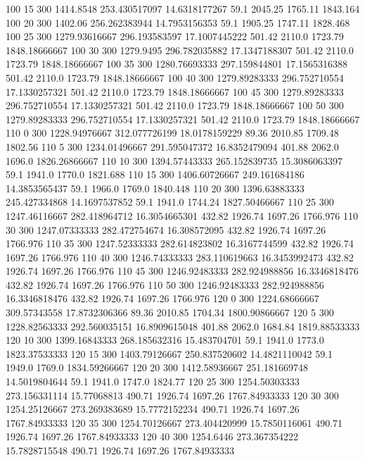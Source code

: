 100  15  300  1414.8548  253.430517097  14.6318177267  59.1  2045.25  1765.11  1843.164 
100  20  300  1402.06  256.262383944  14.7953156353  59.1  1905.25  1747.11  1828.468 
100  25  300  1279.93616667  296.193583597  17.1007445222  501.42  2110.0  1723.79  1848.18666667 
100  30  300  1279.9495  296.782035882  17.1347188307  501.42  2110.0  1723.79  1848.18666667 
100  35  300  1280.76693333  297.159844801  17.1565316388  501.42  2110.0  1723.79  1848.18666667 
100  40  300  1279.89283333  296.752710554  17.1330257321  501.42  2110.0  1723.79  1848.18666667 
100  45  300  1279.89283333  296.752710554  17.1330257321  501.42  2110.0  1723.79  1848.18666667 
100  50  300  1279.89283333  296.752710554  17.1330257321  501.42  2110.0  1723.79  1848.18666667 
110  0  300  1228.94976667  312.077726199  18.0178159229  89.36  2010.85  1709.48  1802.56 
110  5  300  1234.01496667  291.595047372  16.8352479094  401.88  2062.0  1696.0  1826.26866667 
110  10  300  1394.57443333  265.152839735  15.3086063397  59.1  1941.0  1770.0  1821.688 
110  15  300  1406.60726667  249.161684186  14.3853565437  59.1  1966.0  1769.0  1840.448 
110  20  300  1396.63883333  245.427334868  14.1697537852  59.1  1941.0  1744.24  1827.50466667 
110  25  300  1247.46116667  282.418964712  16.3054665301  432.82  1926.74  1697.26  1766.976 
110  30  300  1247.07333333  282.472754674  16.308572095  432.82  1926.74  1697.26  1766.976 
110  35  300  1247.52333333  282.614823802  16.3167744599  432.82  1926.74  1697.26  1766.976 
110  40  300  1246.74333333  283.110619663  16.3453992473  432.82  1926.74  1697.26  1766.976 
110  45  300  1246.92483333  282.924988856  16.3346818476  432.82  1926.74  1697.26  1766.976 
110  50  300  1246.92483333  282.924988856  16.3346818476  432.82  1926.74  1697.26  1766.976 
120  0  300  1224.68666667  309.57343558  17.8732306366  89.36  2010.85  1704.34  1800.90866667 
120  5  300  1228.82563333  292.560035151  16.8909615048  401.88  2062.0  1684.84  1819.88533333 
120  10  300  1399.16843333  268.185632316  15.483704701  59.1  1941.0  1773.0  1823.37533333 
120  15  300  1403.79126667  250.837520602  14.4821110042  59.1  1949.0  1769.0  1834.59266667 
120  20  300  1412.58936667  251.181669748  14.5019804644  59.1  1941.0  1747.0  1824.77 
120  25  300  1254.50303333  273.156331114  15.77068813  490.71  1926.74  1697.26  1767.84933333 
120  30  300  1254.25126667  273.269383689  15.7772152234  490.71  1926.74  1697.26  1767.84933333 
120  35  300  1254.70126667  273.404420999  15.7850116061  490.71  1926.74  1697.26  1767.84933333 
120  40  300  1254.6446  273.367354222  15.7828715548  490.71  1926.74  1697.26  1767.84933333 
